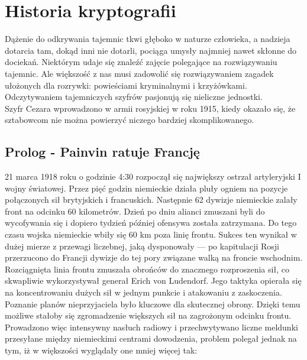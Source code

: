 \documentclass[a4paper]{article}
\begin{document}

\section{Historia kryptografii}

Dążenie do odkrywania tajemnic tkwi głęboko w naturze człowieka, a nadzieja dotarcia tam, dokąd
inni nie dotarli, pociąga umysły najmniej nawet skłonne do dociekań. Niektórym udaje się znaleźć
zajęcie polegające na rozwiązywaniu tajemnic. Ale większość z nas musi zadowolić się rozwiązywaniem
zagadek ułożonych dla rozrywki: powieściami kryminalnymi i krzyżówkami. Odczytywaniem
tajemniczych szyfrów pasjonują się nieliczne jednostki.\\
Szyfr Cezara wprowadzono w armii rosyjskiej w roku 1915, kiedy okazało się, że sztabowcom nie
można powierzyć niczego bardziej skomplikowanego.
\subsection{Prolog - Painvin ratuje Francję}

21 marca 1918 roku o godzinie 4:30 rozpoczął się największy ostrzał artyleryjski I wojny światowej.
Przez pięć godzin niemieckie działa pluły ogniem na pozycje połączonych sił brytyjskich
i francuskich. Następnie 62 dywizje niemieckie zalały front na odcinku 60 kilometrów. Dzień po
dniu alianci zmuszani byli do wycofywania się i dopiero tydzień później ofensywa została zatrzymana.
Do tego czasu wojska niemieckie wbiły się 60 km poza linię frontu. Sukces ten wynikał w
dużej mierze z przewagi liczebnej, jaką dysponowały — po kapitulacji Rosji przerzucono do Francji
dywizje do tej pory związane walką na froncie wschodnim. Rozciągnięta linia frontu zmuszała
obrońców do znacznego rozproszenia sił, co skwapliwie wykorzystywał generał Erich von Ludendorf.
Jego taktyka opierała się na koncentrowaniu dużych sił w jednym punkcie i atakowaniu z
zaskoczenia. Poznanie planów nieprzyjaciela było kluczowe dla skutecznej obrony. Dzięki temu
możliwe stałoby się zgromadzenie większych sił na zagrożonym odcinku frontu. Prowadzono więc
intensywny nasłuch radiowy i przechwytywano liczne meldunki przesyłane między niemieckimi centrami
dowodzenia, problem polegał jednak na tym, iż w większości wyglądały one mniej więcej tak:\\
\end{document}
